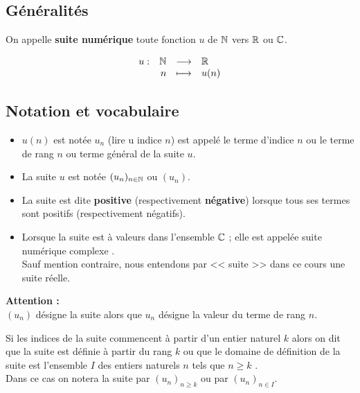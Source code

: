 
\everymath{\displaystyle}


\subsection{Généralités}

\begin{definition}
On appelle \textbf{ suite numérique} toute fonction $ u $ de  $\mathbb{N}  $  vers $ \mathbb{R} $ ou $ \mathbb{C} $.

  \[ \begin{array}{lrcl}
   u  : & \mathbb{N}  &   \longrightarrow & \mathbb{R} \\ 
  &  n & \longmapsto & u(n)
\end{array}\]
 \subsection*{Notation et vocabulaire} 
  \begin{itemize}
  \item[\textbullet] $ u(n) $ est notée $ u_{n} $ (lire u indice $ n $) est appelé le terme d'indice $ n $ ou le terme de rang $ n $ ou terme général de la suite $ u $.
  \item [\textbullet] La suite $ u $ est notée $ (u_{n})_{n\in\mathbb{N}}$ ou $ (u_{n})$.
  \item [\textbullet] La suite est dite \textbf{\color{magenta} positive} (respectivement \textbf{\color{magenta}négative}) lorsque tous ses termes sont positifs (respectivement négatifs).
  \item [\textbullet] Lorsque la suite est à valeurs dans l'ensemble $ \mathbb{C} $  ;  elle est appelée suite numérique complexe .\\
Sauf mention contraire, nous entendons par <<  suite >> dans ce cours une suite réelle.
 \end{itemize}
 \end{definition} 

\textbf{\color{red}Attention :} \\  
  $(u_{n} ) $ désigne la suite alors que $ u_{n} $ désigne la valeur du terme de rang $ n $.
 
 \begin{remark}
Si les indices de la suite commencent à   partir d'un entier naturel $ k $ alors on dit que la suite est définie  à  partir du rang $ k $ ou que le domaine de définition  de la suite est l'ensemble $ I $ des entiers naturels  $ n $ tels que $ n\geq k $ .\\
 Dans ce cas on notera la suite par $ (u_{n})_{n\geq k}$ ou  par  $ (u_{n})_{n\in I}$.
 \end{remark}

